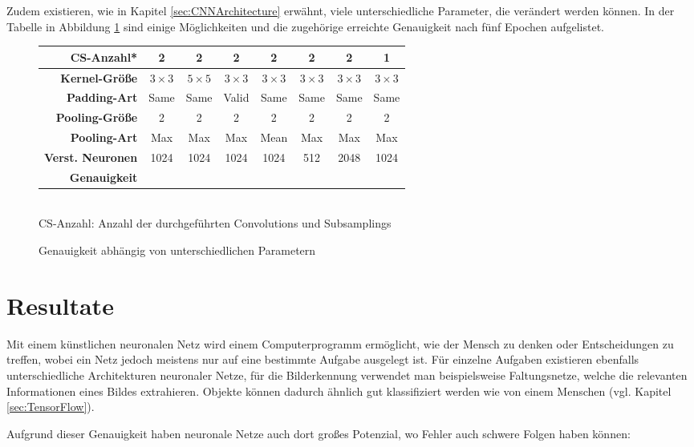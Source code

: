 \documentclass[12pt,a4]{article}
\begin{document}
Zudem existieren, wie in Kapitel \ref{sec:CNNArchitecture} erwähnt, viele unterschiedliche Parameter, die verändert werden können. In der Tabelle in Abbildung \ref{fig:TrainingParameters} sind einige Möglichkeiten und die zugehörige erreichte Genauigkeit nach fünf Epochen aufgelistet.
\clearpage

\begin{figure}[!h]
\centering
\begin{tabular}{| r || c | c | c | c | c | c | c |}
\hline
\textbf{CS-Anzahl*} & 2 & 2 & 2 & 2 & 2 & 2 & 1 \\\hline\hline
\textbf{Kernel-Größe} & $3 \times 3$ & $5 \times 5$ & $3 \times 3$ & $3 \times 3$ & $3 \times 3$ & $3 \times 3$ & $3 \times 3$ \\\hline
\textbf{Padding-Art} & Same & Same & Valid & Same & Same & Same & Same \\\hline\hline
\textbf{Pooling-Größe} & 2 & 2 & 2 & 2 & 2 & 2 & 2 \\\hline
\textbf{Pooling-Art} & Max & Max & Max & Mean & Max & Max & Max \\\hline\hline
\textbf{Verst. Neuronen} & 1024 & 1024 & 1024 & 1024 & 512 & 2048 & 1024 \\\hline\hline
\textbf{Genauigkeit} &  &  &  &  &  &  &  \\\hline
\end{tabular}\\[5pt]
{\small *CS-Anzahl: Anzahl der durchgeführten Convolutions und Subsamplings}
\caption{Genauigkeit abhängig von unterschiedlichen Parametern}
\label{fig:TrainingParameters}
\end{figure}

\section{Resultate}
Mit einem künstlichen neuronalen Netz wird einem Computerprogramm ermöglicht, wie der Mensch zu denken oder Entscheidungen zu treffen, wobei ein Netz jedoch meistens nur auf eine bestimmte Aufgabe ausgelegt ist. Für einzelne Aufgaben existieren ebenfalls unterschiedliche Architekturen neuronaler Netze, für die Bilderkennung verwendet man beispielsweise Faltungsnetze, welche die relevanten Informationen eines Bildes extrahieren. Objekte können dadurch ähnlich gut klassifiziert werden wie von einem Menschen (vgl. Kapitel \ref{sec:TensorFlow}).

Aufgrund dieser Genauigkeit haben neuronale Netze auch dort großes Potenzial, wo Fehler auch schwere Folgen haben können:
\end{document}
